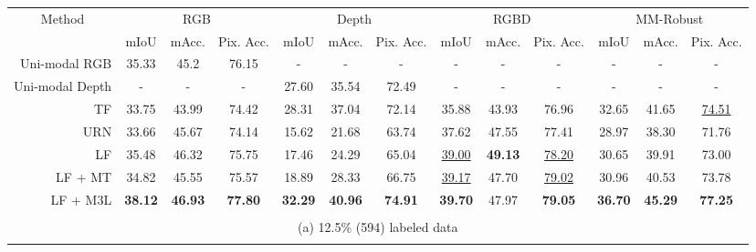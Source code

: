 \documentclass[10pt,twocolumn,letterpaper]{article}
\begin{document}
\begin{table*}[h]
{\begin{tabular}{rccc|ccc|ccc|ccc}
\toprule
\multicolumn{1}{c}{\multirow{2}{*}{Method}} & \multicolumn{3}{c|}{RGB} & \multicolumn{3}{c|}{Depth} & \multicolumn{3}{c|}{RGBD} & \multicolumn{3}{c}{MM-Robust} \\
\multicolumn{1}{c}{} & mIoU & mAcc. & Pix. Acc. & mIoU & mAcc. & Pix. Acc. & mIoU & mAcc. & Pix. Acc. & mIoU & mAcc. & Pix. Acc. \\ \midrule
Uni-modal RGB & 35.33 & 45.2 & 76.15 & - & - & - & - & - & - & - & - & - \\
Uni-modal Depth & - & - & - & 27.60 & 35.54 & 72.49 & - & - & - & - & - & - \\
TF \cite{tokenfusion}& 33.75 & 43.99 & 74.42 & 28.31 & 37.04 & 72.14 & 35.88 & 43.93 & 76.96 & 32.65 & 41.65 & \underline{74.51} \\
URN \cite{urn}& 33.66 & 45.67 & 74.14 & 15.62 & 21.68 & 63.74 & 37.62 & 47.55 & 77.41 & 28.97 & 38.30 & 71.76 \\
LF & 35.48 & 46.32 & 75.75 & 17.46 & 24.29 & 65.04 & \underline{39.00} & \textbf{49.13} & \underline{78.20} & 30.65 & 39.91 & 73.00 \\ \midrule
LF + MT & 34.82 & 45.55 & 75.57 & 18.89 & 28.33 & 66.75 & \underline{39.17} & 47.70 & \underline{79.02} & 30.96 & 40.53 & 73.78 \\
LF + M3L & \textbf{38.12} & \textbf{46.93} & \textbf{77.80} & \textbf{32.29} & \textbf{40.96} & \textbf{74.91} & \textbf{39.70} & 47.97 & \textbf{79.05} & \textbf{36.70} & \textbf{45.29} & \textbf{77.25} \\ \bottomrule


\multicolumn{13}{c}{\vspace{0.1cm}}\\
\multicolumn{13}{c}{(a) 12.5\% (594) labeled data}\\
\multicolumn{13}{c}{\vspace{0.4cm}}\\




\end{tabular}}
\end{table*}
\end{document}
